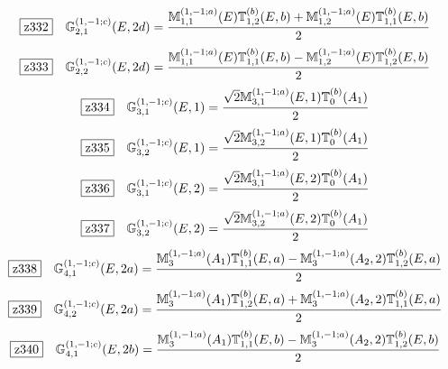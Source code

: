 \documentclass[fleqn,10pt,landscape]{jsarticle}
\begin{document}
\begin{dmath*}
\hspace*{3mm}\fbox{z332}\quad \mathbb{G}_{2,1}^{(1,-1;c)}(E,2d)=\frac{\mathbb{M}_{1,1}^{(1,-1;a)}(E) \mathbb{T}_{1,2}^{(b)}(E,b) + \mathbb{M}_{1,2}^{(1,-1;a)}(E) \mathbb{T}_{1,1}^{(b)}(E,b)}{2}
\end{dmath*}
\begin{dmath*}
\hspace*{3mm}\fbox{z333}\quad \mathbb{G}_{2,2}^{(1,-1;c)}(E,2d)=\frac{\mathbb{M}_{1,1}^{(1,-1;a)}(E) \mathbb{T}_{1,1}^{(b)}(E,b) - \mathbb{M}_{1,2}^{(1,-1;a)}(E) \mathbb{T}_{1,2}^{(b)}(E,b)}{2}
\end{dmath*}
\begin{dmath*}
\hspace*{3mm}\fbox{z334}\quad \mathbb{G}_{3,1}^{(1,-1;c)}(E,1)=\frac{\sqrt{2} \mathbb{M}_{3,1}^{(1,-1;a)}(E,1) \mathbb{T}_{0}^{(b)}(A_{1})}{2}
\end{dmath*}
\begin{dmath*}
\hspace*{3mm}\fbox{z335}\quad \mathbb{G}_{3,2}^{(1,-1;c)}(E,1)=\frac{\sqrt{2} \mathbb{M}_{3,2}^{(1,-1;a)}(E,1) \mathbb{T}_{0}^{(b)}(A_{1})}{2}
\end{dmath*}
\begin{dmath*}
\hspace*{3mm}\fbox{z336}\quad \mathbb{G}_{3,1}^{(1,-1;c)}(E,2)=\frac{\sqrt{2} \mathbb{M}_{3,1}^{(1,-1;a)}(E,2) \mathbb{T}_{0}^{(b)}(A_{1})}{2}
\end{dmath*}
\begin{dmath*}
\hspace*{3mm}\fbox{z337}\quad \mathbb{G}_{3,2}^{(1,-1;c)}(E,2)=\frac{\sqrt{2} \mathbb{M}_{3,2}^{(1,-1;a)}(E,2) \mathbb{T}_{0}^{(b)}(A_{1})}{2}
\end{dmath*}
\begin{dmath*}
\hspace*{3mm}\fbox{z338}\quad \mathbb{G}_{4,1}^{(1,-1;c)}(E,2a)=\frac{\mathbb{M}_{3}^{(1,-1;a)}(A_{1}) \mathbb{T}_{1,1}^{(b)}(E,a) - \mathbb{M}_{3}^{(1,-1;a)}(A_{2},2) \mathbb{T}_{1,2}^{(b)}(E,a)}{2}
\end{dmath*}
\begin{dmath*}
\hspace*{3mm}\fbox{z339}\quad \mathbb{G}_{4,2}^{(1,-1;c)}(E,2a)=\frac{\mathbb{M}_{3}^{(1,-1;a)}(A_{1}) \mathbb{T}_{1,2}^{(b)}(E,a) + \mathbb{M}_{3}^{(1,-1;a)}(A_{2},2) \mathbb{T}_{1,1}^{(b)}(E,a)}{2}
\end{dmath*}
\begin{dmath*}
\hspace*{3mm}\fbox{z340}\quad \mathbb{G}_{4,1}^{(1,-1;c)}(E,2b)=\frac{\mathbb{M}_{3}^{(1,-1;a)}(A_{1}) \mathbb{T}_{1,1}^{(b)}(E,b) - \mathbb{M}_{3}^{(1,-1;a)}(A_{2},2) \mathbb{T}_{1,2}^{(b)}(E,b)}{2}
\end{dmath*}
\end{document}
